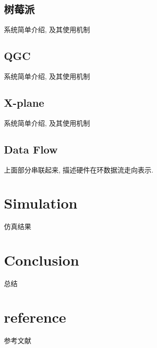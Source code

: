 \documentclass[UTF8,a4paper,10pt,nocolorlinks]{ctexart}
\begin{document}
        \subsection{树莓派}
            系统简单介绍, 及其使用机制

        \subsection{QGC}
            系统简单介绍, 及其使用机制

        \subsection{X-plane}
            系统简单介绍, 及其使用机制
    
        \subsection{Data Flow}
            上面部分串联起来, 描述硬件在环数据流走向表示.
    
    \clearpage    
    \section{Simulation}
        仿真结果
    \clearpage
    \section{Conclusion}
        总结
        \clearpage
    \section{reference}
        参考文献
\end{document}
